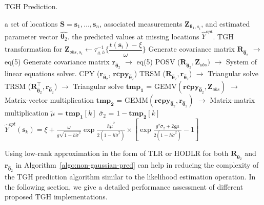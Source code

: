 \documentclass[conference]{IEEEtran}
\begin{document}
\begin{algorithm}[H]

\caption{TGH Prediction.}
\label{algo:non-gaussian-pred}
\begin{algorithmic}[1]
 a set of locations $\bm{S} = \bm s_1,\ldots,\bm s_n$,   associated measurements $\bm{Z}_{\bm{\theta}_1,s_i}$, and estimated parameter vector $\widehat{\bm{\theta}_2}$.
 the predicted values at missing locations $\widehat{Y}^{opt}$.
\STATE TGH transformation for $\bm{Z}_{obs,s_i} \leftarrow \tau_{g,h}^{-1} \bigg \{ \dfrac{t(\bm{s}_i) - \xi}{\omega} \bigg \}$
\STATE  Generate covariance matrix $\bm{R}_{\widehat{\bm{\theta}}_2}$ $\rightarrow$ eq(5)
    \STATE Generate covariance matrix $\bm{r}_{\widehat{\bm{\theta}}_2}$  $\rightarrow$ eq(5)
\STATE  POSV ($\bm{R}_{\widehat{\bm{\theta}}_2}, \bm{Z}_{obs})$ $\rightarrow$ System of linear equations solver.
        \STATE CPY ($\bm{r}_{\widehat{\bm{\theta}}_2}$, $\bm{rcpy}_{\widehat{\bm{\theta}}_2}$) 
    \STATE TRSM ($\bm{R}_{\widehat{\bm{\theta}}_2}, \bm{r}_{\widehat{\bm{\theta}}_2}$) $\rightarrow$ Triangular solve
        \STATE TRSM ($\bm{R}_{\widehat{\bm{\theta}}_2}^\top, \bm{r}_{\widehat{\bm{\theta}}_2}$) $\rightarrow$ Triangular solve
                \STATE $\bm{tmp_1}$ = GEMV$(\bm{rcpy}_{\widehat{\bm{\theta}}_2}, \bm{Z}_{obs})$ $\rightarrow$ Matrix-vector multiplication 
                \STATE $\bm{tmp_2}$ = GEMM$ (\bm{rcpy}_{\widehat{\bm{\theta}}_2}, \bm{r}_{\widehat{\bm{\theta}}_2})$ $\rightarrow$ Matrix-matrix multiplication 
                \STATE $\tilde{\mu}$ =  $\bm{tmp_1}[k]$
        \STATE $\tilde{\sigma_2}$ = $1-\bm{tmp_2}[k]$
        \STATE $\widehat{Y}^{opt}(\bm{s}_k)=\xi +  \frac{\omega}{g\sqrt{1-h\tilde{\sigma}^2}} \exp{\frac{h\tilde{\mu}^2}{2(1-h\tilde{\sigma}^2)}}      \times [\exp{\frac{g^2\tilde{\sigma}_2+2g\tilde{\mu}}{2(1-h\tilde{\sigma}^2)}-1}] $
  \ENDFOR
\end{algorithmic}
\end{algorithm}


Using low-rank approximation in the form of TLR or HODLR for both $\bm{R}_{\widehat{\bm{\theta}}_2}$ and $\bm{r}_{\widehat{\bm{\theta}}_2}$  in
 Algorithm~\ref{algo:non-gaussian-pred} can help
in reducing the complexity of the TGH prediction algorithm
similar to the likelihood estimation operation. In the following
section, we give a detailed performance assessment of different
proposed TGH implementations.
\end{document}
